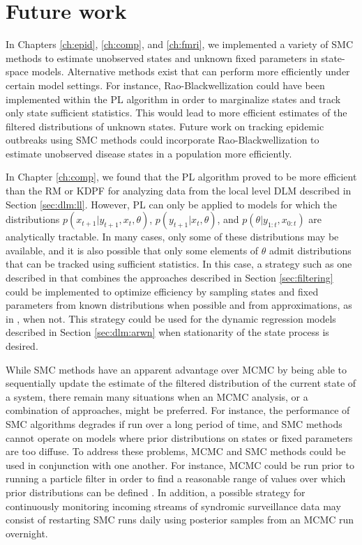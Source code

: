 \chapter{Future work \label{ch:future}}

In Chapters \ref{ch:epid}, \ref{ch:comp}, and \ref{ch:fmri}, we implemented a variety of SMC methods to estimate unobserved states and unknown fixed parameters in state-space models. Alternative methods exist that can perform more efficiently under certain model settings. For instance, Rao-Blackwellization \citep{Douc:Gods:Andr:on:2000} could have been implemented within the PL algorithm in order to marginalize states and track only state sufficient statistics. This would lead to more efficient estimates of the filtered distributions of unknown states. Future work on tracking epidemic outbreaks using SMC methods could incorporate Rao-Blackwellization to estimate unobserved disease states in a population more efficiently.

In Chapter \ref{ch:comp}, we found that the PL algorithm proved to be more efficient than the RM or KDPF for analyzing data from the local level DLM described in Section \ref{sec:dlm:ll}. However, PL can only be applied to models for which the distributions $p(x_{t+1}|y_{t+1},x_t,\theta)$, $p(y_{t+1}|x_t,\theta)$, and $p(\theta|y_{1:t},x_{0:t})$ are analytically tractable. In many cases, only some of these distributions may be available, and it is also possible that only some elements of $\theta$ admit distributions that can be tracked using sufficient statistics. In this case, a strategy such as one described in \citet{dukic2012tracking} that combines the approaches described in Section \ref{sec:filtering} could be implemented to optimize efficiency by sampling states and fixed parameters from known distributions when possible and from approximations, as in \citet{Liu:West:comb:2001}, when not. This strategy could be used for the dynamic regression models described in Section \ref{sec:dlm:arwn} when stationarity of the state process is desired.

While SMC methods have an apparent advantage over MCMC by being able to sequentially update the estimate of the filtered distribution of the current state of a system, there remain many situations when an MCMC analysis, or a combination of approaches, might be preferred. For instance, the performance of SMC algorithms degrades if run over a long period of time, and SMC methods cannot operate on models where prior distributions on states or fixed parameters are too diffuse. To address these problems, MCMC and SMC methods could be used in conjunction with one another. For instance, MCMC could be run prior to running a particle filter in order to find a reasonable range of values over which prior distributions can be defined \cite[Chapter 5][]{petris:camp:2009:dynamic}. In addition, a possible strategy for continuously monitoring incoming streams of syndromic surveillance data may consist of restarting SMC runs daily using posterior samples from an MCMC run overnight.

